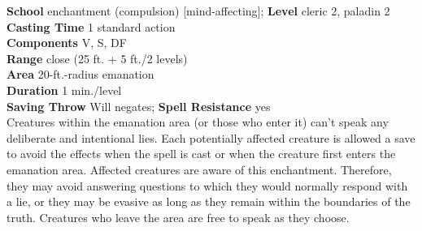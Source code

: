 \textbf{School} enchantment (compulsion) [mind-affecting]; \textbf{Level} cleric 2, paladin 2\\
\textbf{Casting Time} 1 standard action\\
\textbf{Components} V, S, DF\\
\textbf{Range} close (25 ft. + 5 ft./2 levels)\\
\textbf{Area} 20-ft.-radius emanation\\
\textbf{Duration} 1 min./level\\
\textbf{Saving Throw }Will negates; \textbf{Spell Resistance} yes\\
Creatures within the emanation area (or those who enter it) can't speak any deliberate and intentional lies. Each potentially affected creature is allowed a save to avoid the effects when the spell is cast or when the creature first enters the emanation area. Affected creatures are aware of this enchantment. Therefore, they may avoid answering questions to which they would normally respond with a lie, or they may be evasive as long as they remain within the boundaries of the truth. Creatures who leave the area are free to speak as they choose.\\
